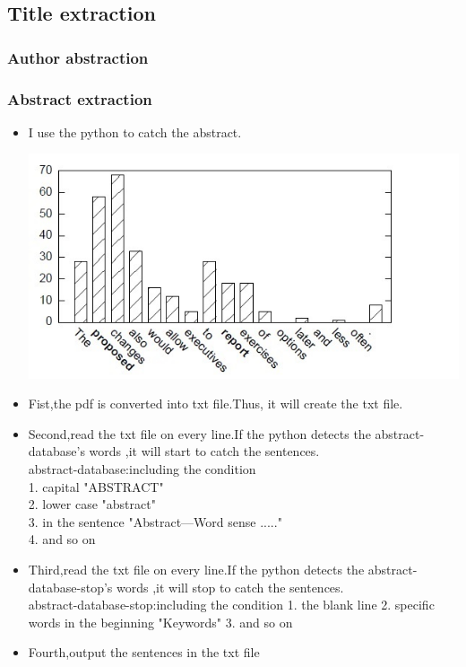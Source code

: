 	
\subsection*{Title extraction}

\subsubsection*{Author abstraction}


\subsubsection*{Abstract extraction}
\begin{itemize}
	\item I use the python to catch the abstract.
	\begin{center}
		\includegraphics[width=0.8\columnwidth]{Union_Background_Chart_2}
	\end{center}
	\item Fist,the pdf is converted into txt file.Thus, it will create the txt file.\\ 
	\item Second,read the txt file on every line.If the python detects the abstract-database's words ,it will start to catch the sentences.\\ 	
	abstract-database:including the condition\\
	1. capital         "ABSTRACT"\\
	2. lower case      "abstract"\\
	3. in the sentence "Abstract—Word sense ....."\\
	4. and so on \\
	\item Third,read the txt file on every line.If the python detects the abstract-database-stop's words ,it will stop to catch the sentences.\\ 
	abstract-database-stop:including the condition
	1. the blank line
	2. specific words in the beginning "Keywords"
	3. and so on
	\item Fourth,output the sentences in the txt file\\ 	
	
\end{itemize}

